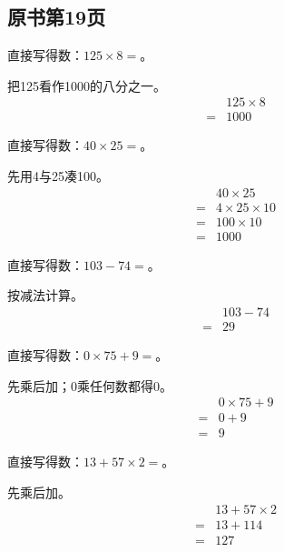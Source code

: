 

\subsection*{原书第19页}

直接写得数：\(125\times8=\)。\par
\begin{BookAnswer}
把125看作1000的八分之一。\[\begin{aligned} &125\times8\\={}&1000\end{aligned}\]
\end{BookAnswer}

直接写得数：\(40\times25=\)。\par
\begin{BookAnswer}
先用4与25凑100。\[\begin{aligned} &40\times25\\={}&4\times25\times10\\={}&100\times10\\={}&1000\end{aligned}\]
\end{BookAnswer}

直接写得数：\(103-74=\)。\par
\begin{BookAnswer}
按减法计算。\[\begin{aligned} &103-74\\={}&29\end{aligned}\]
\end{BookAnswer}

直接写得数：\(0\times75+9=\)。\par
\begin{BookAnswer}
先乘后加；0乘任何数都得0。\[\begin{aligned} &0\times75+9\\={}&0+9\\={}&9\end{aligned}\]
\end{BookAnswer}

直接写得数：\(13+57\times2=\)。\par
\begin{BookAnswer}
先乘后加。\[\begin{aligned} &13+57\times2\\={}&13+114\\={}&127\end{aligned}\]
\end{BookAnswer}

